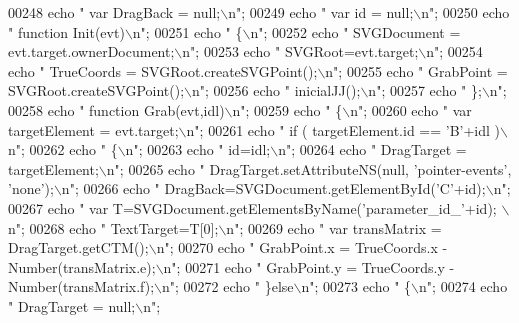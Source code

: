 \begin{DoxyCode}
{{00248     echo \textcolor{stringliteral}{"        var DragBack = null;\(\backslash\)n"};
00249     echo \textcolor{stringliteral}{"        var id = null;\(\backslash\)n"};
00250     echo \textcolor{stringliteral}{"        function Init(evt)\(\backslash\)n"};
00251     echo \textcolor{stringliteral}{"        \{\(\backslash\)n"};
00252     echo \textcolor{stringliteral}{"           SVGDocument = evt.target.ownerDocument;\(\backslash\)n"};
00253     echo \textcolor{stringliteral}{"           SVGRoot=evt.target;\(\backslash\)n"};
00254     echo \textcolor{stringliteral}{"           TrueCoords = SVGRoot.createSVGPoint();\(\backslash\)n"};
00255     echo \textcolor{stringliteral}{"           GrabPoint = SVGRoot.createSVGPoint();\(\backslash\)n"};
00256     echo \textcolor{stringliteral}{"           inicialJJ();\(\backslash\)n"};
00257     echo \textcolor{stringliteral}{"        \};\(\backslash\)n"};
00258     echo \textcolor{stringliteral}{"        function Grab(evt,idl)\(\backslash\)n"};
00259     echo \textcolor{stringliteral}{"        \{\(\backslash\)n"};
00260     echo \textcolor{stringliteral}{"           var targetElement = evt.target;\(\backslash\)n"};
00261     echo \textcolor{stringliteral}{"           if ( targetElement.id == 'B'+idl )\(\backslash\)n"};
00262     echo \textcolor{stringliteral}{"           \{\(\backslash\)n"};
00263     echo \textcolor{stringliteral}{"             id=idl;\(\backslash\)n"};
00264     echo \textcolor{stringliteral}{"             DragTarget = targetElement;\(\backslash\)n"};
00265     echo \textcolor{stringliteral}{"             DragTarget.setAttributeNS(null, 'pointer-events',
       'none');\(\backslash\)n"};
00266     echo \textcolor{stringliteral}{"             DragBack=SVGDocument.getElementById('C'+id);\(\backslash\)n"};
00267     echo \textcolor{stringliteral}{"             var T=SVGDocument.getElementsByName('parameter\_id\_'+id);
      \(\backslash\)n"};
00268     echo \textcolor{stringliteral}{"             TextTarget=T[0];\(\backslash\)n"};
00269     echo \textcolor{stringliteral}{"             var transMatrix = DragTarget.getCTM();\(\backslash\)n"};
00270     echo \textcolor{stringliteral}{"             GrabPoint.x = TrueCoords.x - Number(transMatrix.e);\(\backslash\)n"};
00271     echo \textcolor{stringliteral}{"             GrabPoint.y = TrueCoords.y - Number(transMatrix.f);\(\backslash\)n"};
00272     echo \textcolor{stringliteral}{"           \}else\(\backslash\)n"};
00273     echo \textcolor{stringliteral}{"           \{\(\backslash\)n"};
00274     echo \textcolor{stringliteral}{"             DragTarget = null;\(\backslash\)n"};
}}
\end{DoxyCode}
